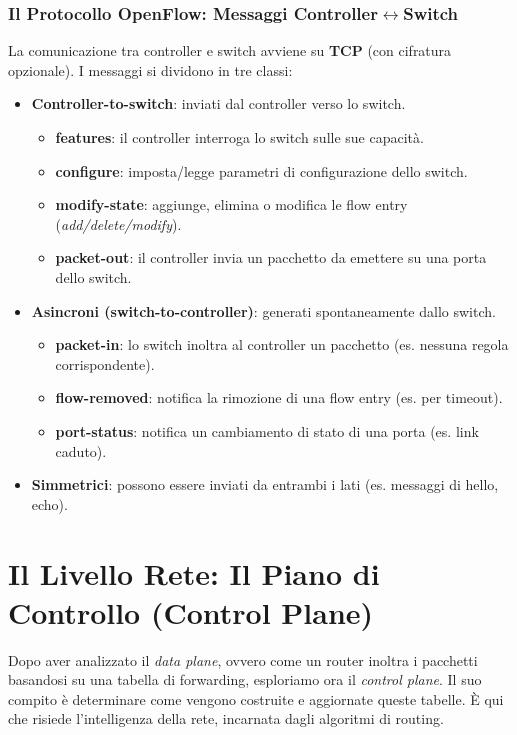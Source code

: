 \subsection{Il Protocollo OpenFlow: Messaggi Controller$\leftrightarrow$Switch}
La comunicazione tra controller e switch avviene su \textbf{TCP} (con cifratura opzionale). I messaggi si dividono in tre classi:
\begin{itemize}
    \item \textbf{Controller-to-switch}: inviati dal controller verso lo switch.
    \begin{itemize}
        \item \textbf{features}: il controller interroga lo switch sulle sue capacità.
        \item \textbf{configure}: imposta/legge parametri di configurazione dello switch.
        \item \textbf{modify-state}: aggiunge, elimina o modifica le flow entry (\textit{add/delete/modify}).
        \item \textbf{packet-out}: il controller invia un pacchetto da emettere su una porta dello switch.
    \end{itemize}
    \item \textbf{Asincroni (switch-to-controller)}: generati spontaneamente dallo switch.
    \begin{itemize}
        \item \textbf{packet-in}: lo switch inoltra al controller un pacchetto (es. nessuna regola corrispondente).
        \item \textbf{flow-removed}: notifica la rimozione di una flow entry (es. per timeout).
        \item \textbf{port-status}: notifica un cambiamento di stato di una porta (es. link caduto).
    \end{itemize}
    \item \textbf{Simmetrici}: possono essere inviati da entrambi i lati (es. messaggi di hello, echo).
\end{itemize}


\chapter{Il Livello Rete: Il Piano di Controllo (Control Plane)}
Dopo aver analizzato il \textit{data plane}, ovvero come un router inoltra i pacchetti basandosi su una tabella di forwarding, esploriamo ora il \textit{control plane}. Il suo compito è determinare come vengono costruite e aggiornate queste tabelle. È qui che risiede l'intelligenza della rete, incarnata dagli algoritmi di routing.

